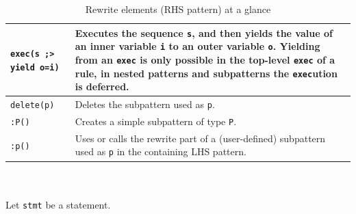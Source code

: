\begin{table}[htbp]
\begin{minipage}{\linewidth}
\begin{tabularx}{\linewidth}{|lX|}
\hline
\texttt{exec(s ;> yield o=i)} & Executes the sequence \texttt{s}, and then yields the value of an inner variable \texttt{i} to an outer variable \texttt{o}. Yielding from an \texttt{exec} is only possible in the top-level \texttt{exec} of a rule, in nested patterns and subpatterns the \texttt{exec}ution is deferred.\\
\hline
\texttt{delete(p)} & Deletes the subpattern used as \texttt{p}.\\
\texttt{:P()} & Creates a simple subpattern of type \texttt{P}.\\
\texttt{:p()} & Uses or calls the rewrite part of a (user-defined) subpattern used as \texttt{p} in the containing LHS pattern.\\
\hline
\end{tabularx}
\end{minipage}\\
\\ 
{\small Let \texttt{stmt} be a statement.}
\caption{Rewrite elements (RHS pattern) at a glance}
\label{rewritestab}
\end{table}


